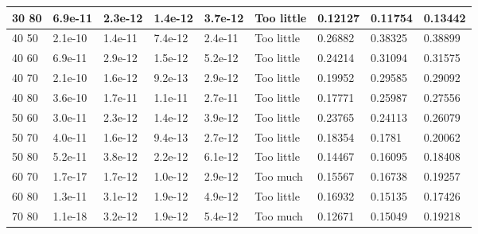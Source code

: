 \begin{tabular}{lllllllll}
30  80 & 6.9e-11 & 2.3e-12 & 1.4e-12 & 3.7e-12 & Too little & 0.12127 & 0.11754 & 0.13442 \\ \hline 
40  50 & 2.1e-10 & 1.4e-11 & 7.4e-12 & 2.4e-11 & Too little & 0.26882 & 0.38325 & 0.38899 \\ \hline 
40  60 & 6.9e-11 & 2.9e-12 & 1.5e-12 & 5.2e-12 & Too little & 0.24214 & 0.31094 & 0.31575 \\ \hline 
40  70 & 2.1e-10 & 1.6e-12 & 9.2e-13 & 2.9e-12 & Too little & 0.19952 & 0.29585 & 0.29092 \\ \hline 
40  80 & 3.6e-10 & 1.7e-11 & 1.1e-11 & 2.7e-11 & Too little & 0.17771 & 0.25987 & 0.27556 \\ \hline 
50  60 & 3.0e-11 & 2.3e-12 & 1.4e-12 & 3.9e-12 & Too little & 0.23765 & 0.24113 & 0.26079 \\ \hline 
50  70 & 4.0e-11 & 1.6e-12 & 9.4e-13 & 2.7e-12 & Too little & 0.18354 & 0.1781 & 0.20062 \\ \hline 
50  80 & 5.2e-11 & 3.8e-12 & 2.2e-12 & 6.1e-12 & Too little & 0.14467 & 0.16095 & 0.18408 \\ \hline 
60  70 & 1.7e-17 & 1.7e-12 & 1.0e-12 & 2.9e-12 & Too much & 0.15567 & 0.16738 & 0.19257 \\ \hline 
60  80 & 1.3e-11 & 3.1e-12 & 1.9e-12 & 4.9e-12 & Too little & 0.16932 & 0.15135 & 0.17426 \\ \hline 
70  80 & 1.1e-18 & 3.2e-12 & 1.9e-12 & 5.4e-12 & Too much & 0.12671 & 0.15049 & 0.19218 \\ \hline 
\hline 
\end{tabular}